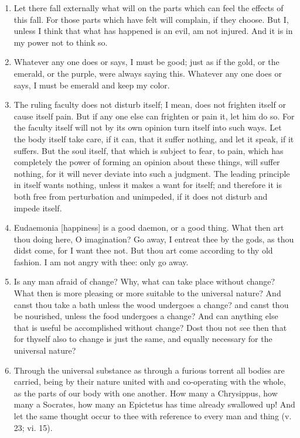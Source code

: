 \begin{enumerate}
\item Let there fall externally what will on the parts which can feel the effects of this fall. For those parts which have felt will complain, if they choose. But I, unless I think that what has happened is an evil, am not injured. And it is in my power not to think so.

\item Whatever any one does or says, I must be good; just as if the gold, or the emerald, or the purple, were always saying this. Whatever any one does or says, I must be emerald and keep my color.

\item The ruling faculty does not disturb itself; I mean, does not frighten itself or cause itself pain. But if any one else can frighten or pain it, let him do so. For the faculty itself will not by its own opinion turn itself into such ways. Let the body itself take care, if it can, that it suffer nothing, and let it speak, if it suffers. But the soul itself, that which is subject to fear, to pain, which has completely the power of forming an opinion about these things, will suffer nothing, for it will never deviate into such a judgment. The leading principle in itself wants nothing, unless it makes a want for itself; and therefore it is both free from perturbation and unimpeded, if it does not disturb and impede itself.

\item Eudaemonia [{\clarify happiness}] is a good daemon, or a good thing. What then art thou doing here, O imagination? Go away, I entreat thee by the gods, as thou didst come, for I want thee not. But thou art come according to thy old fashion. I am not angry with thee: only go away.

\item Is any man afraid of change? Why, what can take place without change? What then is more pleasing or more suitable to the universal nature? And canst thou take a bath unless the wood undergoes a change? and canst thou be nourished, unless the food undergoes a change? And can anything else that is useful be accomplished without change? Dost thou not see then that for thyself also to change is just the same, and equally necessary for the universal nature?

\item Through the universal substance as through a furious torrent all bodies are carried, being by their nature united with and co-operating with the whole, as the parts of our body with one another. How many a Chrysippus, how many a Socrates, how many an Epictetus has time already swallowed up! And let the same thought occur to thee with reference to every man and thing (v. 23; vi. 15).


\end{enumerate}
